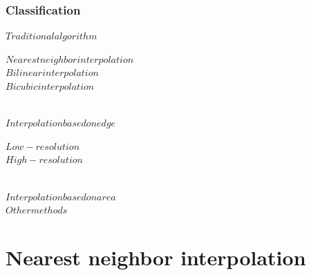 \documentclass[notheorems,serif,table,compress]{beamer}  %
\begin{document}
\begin{frame}
\frametitle{Classification}
	\begin{cases}
	$Traditional algorithm$	
		\begin{cases}
		$Nearest neighbor interpolation$\\
		$Bilinear interpolation$\\
		$Bicubic interpolation$
		\end{cases}\\
	$Interpolation based on edge$
		\begin{cases}
		$Low-resolution$\\
		$High-resolution$
		\end{cases}\\
	$Interpolation based on area$\\
	$Other methods$
	\end{cases}
\end{frame}


\section{Nearest neighbor interpolation}
\end{document}
